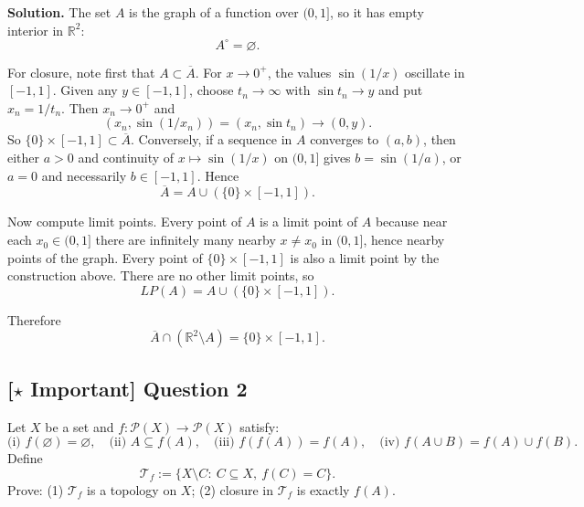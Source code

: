 \documentclass{article}
\newcommand{\R}{\mathbb{R}}
\newcommand{\important}{\texorpdfstring{\textbf{[\(\star\) Important]}}{[Important]}}
\newenvironment{solution}{\par\noindent\textbf{Solution.}\quad}{\par}
\begin{document}
\begin{solution}
The set $A$ is the graph of a function over $(0,1]$, so it has empty interior in $\R^2$:
\[
A^{\circ}=\varnothing.
\]

For closure, note first that $A\subset\overline A$. For $x\to0^+$, the values $\sin(1/x)$ oscillate in $[-1,1]$.
Given any $y\in[-1,1]$, choose $t_n\to\infty$ with $\sin t_n\to y$ and put $x_n=1/t_n$. Then $x_n\to0^+$ and
\[
(x_n,\sin(1/x_n))=(x_n,\sin t_n)\to(0,y).
\]
So $\{0\}\times[-1,1]\subset\overline A$.
Conversely, if a sequence in $A$ converges to $(a,b)$, then either $a>0$ and continuity of $x\mapsto\sin(1/x)$ on $(0,1]$ gives $b=\sin(1/a)$, or $a=0$ and necessarily $b\in[-1,1]$. Hence
\[
\overline A=A\cup(\{0\}\times[-1,1]).
\]

Now compute limit points.
Every point of $A$ is a limit point of $A$ because near each $x_0\in(0,1]$ there are infinitely many nearby $x\neq x_0$ in $(0,1]$, hence nearby points of the graph.
Every point of $\{0\}\times[-1,1]$ is also a limit point by the construction above.
There are no other limit points, so
\[
LP(A)=A\cup(\{0\}\times[-1,1]).
\]

Therefore
\[
\overline A\cap(\R^2\setminus A)=\{0\}\times[-1,1].
\]
\end{solution}

\subsection{\important{} Question 2}

Let $X$ be a set and $f:\mathcal P(X)\to\mathcal P(X)$ satisfy:
\[
\text{(i) }f(\varnothing)=\varnothing,\quad
\text{(ii) }A\subseteq f(A),\quad
\text{(iii) }f(f(A))=f(A),\quad
\text{(iv) }f(A\cup B)=f(A)\cup f(B).
\]
Define
\[
\mathcal{T}_f:=\{X\setminus C:\ C\subseteq X,\ f(C)=C\}.
\]
Prove: (1) $\mathcal{T}_f$ is a topology on $X$; (2) closure in $\mathcal{T}_f$ is exactly $f(A)$.
\end{document}
